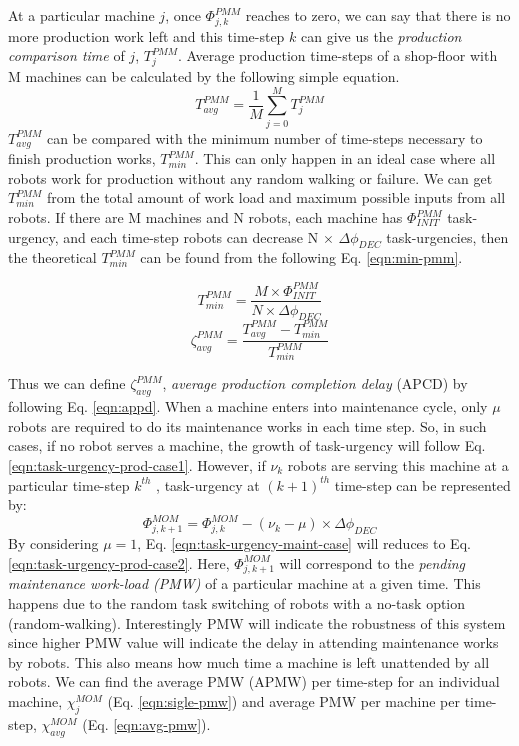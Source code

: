 \documentclass[smallcondensed]{svjour3}
\begin{document}
At a particular machine $j$, once $\Phi_{j, k}^{PMM}$ reaches to zero, we can say that there is no more production work left and this time-step $k$ can give us the {\em production comparison time} of $j$, $T_{j}^{PMM}$. Average production time-steps of a shop-floor with M machines can be calculated by the following simple equation.
\begin{equation}
T_{avg}^{PMM} = \frac{1}{M} \sum_{j=0}^{M} T_{j}^{PMM} 
\label{eqn:avg-pmm}
\end{equation}
$T_{avg}^{PMM}$ can be compared with the minimum number of time-steps necessary to finish production works, $T_{min}^{PMM}$. This can only happen in an ideal case where all robots work for production without any random walking or failure. We can get $T_{min}^{PMM}$ from the total amount of work load and maximum possible inputs from all robots. If there are M machines and N robots, each machine has $\Phi_{INIT}^{PMM}$ task-urgency, and each time-step robots can decrease N $\times$ $\Delta \phi_{DEC}$ task-urgencies, then the theoretical $T_{min}^{PMM}$ can be found from the following Eq. \ref{eqn:min-pmm}.
%
\begin{multicols}{2}
\small
\begin{equation}
T_{min}^{PMM} = \frac{M \times \Phi_{INIT}^{PMM}}{N \times \Delta \phi_{DEC}} 
\label{eqn:min-pmm}
\end{equation}
\vspace*{0.2cm}
\begin{equation}
\zeta_{avg}^{PMM} = \frac{T_{avg}^{PMM} - T_{min}^{PMM}}{T_{min}^{PMM}} 
\label{eqn:appd}
\end{equation}
\end{multicols}
Thus we can define $\zeta_{avg}^{PMM}$, {\em average production completion delay} (APCD) by following Eq. \ref{eqn:appd}.
When a machine enters into maintenance cycle, only $\mu$ robots are required to do its maintenance works in each time step. So, in such cases, if no robot serves a machine, the growth of task-urgency will follow Eq. \ref{eqn:task-urgency-prod-case1}. However, if $\nu_{k}$ robots are serving this machine at a particular time-step $k^{th}$ , task-urgency at $(k+1)^{th}$ time-step can be represented by:
\begin{equation}
\Phi_{j, k+1}^{MOM} = \Phi_{j, k}^{MOM}- (\nu_{k} - \mu) \times \Delta \phi_{DEC}
\label{eqn:task-urgency-maint-case}
\end{equation}
By considering $\mu = 1$, Eq. \ref{eqn:task-urgency-maint-case} will reduces to Eq. \ref{eqn:task-urgency-prod-case2}. Here, $\Phi_{j, k+1}^{MOM}$ will correspond to the {\em pending maintenance work-load (PMW)} of a particular machine at a given time. This happens due to the random task switching of robots with a no-task option (random-walking). Interestingly PMW will indicate the robustness of this system since higher PMW value will indicate the delay in attending maintenance works by robots. This also means how much time a machine is left unattended by all robots. We can find the average PMW (APMW) per time-step for an individual  machine, $\chi_{j}^{MOM}$ (Eq. \ref{eqn:sigle-pmw}) and average PMW per machine per time-step, $\chi_{avg}^{MOM}$ (Eq. \ref{eqn:avg-pmw}).
\end{document}
